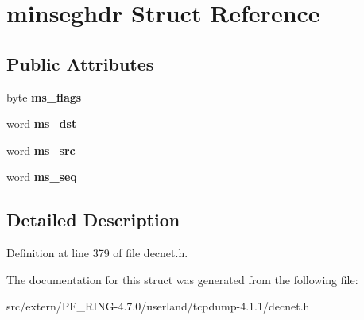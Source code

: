 \hypertarget{structminseghdr}{
\section{minseghdr Struct Reference}
\label{structminseghdr}
}
\subsection*{Public Attributes}
\begin{DoxyCompactItemize}
\item 
\hypertarget{structminseghdr_a6eb5dcbcc5009d5e658eed759a3b1b01}{
byte {\bfseries ms\_\-flags}}
\label{structminseghdr_a6eb5dcbcc5009d5e658eed759a3b1b01}

\item 
\hypertarget{structminseghdr_a7d90d6e6d088537b8a7fdb956f1b7f37}{
word {\bfseries ms\_\-dst}}
\label{structminseghdr_a7d90d6e6d088537b8a7fdb956f1b7f37}

\item 
\hypertarget{structminseghdr_a9a39457e18aa457f91d753547bc4c22d}{
word {\bfseries ms\_\-src}}
\label{structminseghdr_a9a39457e18aa457f91d753547bc4c22d}

\item 
\hypertarget{structminseghdr_a07c19a82da270cb661bcfef55b3d6386}{
word {\bfseries ms\_\-seq}}
\label{structminseghdr_a07c19a82da270cb661bcfef55b3d6386}

\end{DoxyCompactItemize}


\subsection{Detailed Description}


Definition at line 379 of file decnet.h.



The documentation for this struct was generated from the following file:\begin{DoxyCompactItemize}
\item 
src/extern/PF\_\-RING-\/4.7.0/userland/tcpdump-\/4.1.1/decnet.h\end{DoxyCompactItemize}
